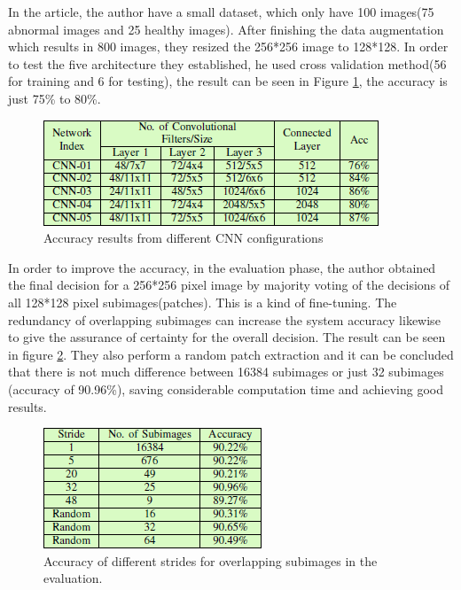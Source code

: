\documentclass[10pt,twocolumn,letterpaper]{article}
\begin{document}
In the article\cite{ribeiro2016colonic}, the author have a small dataset, which only have 100 images(75 abnormal images and 25 healthy images). After finishing the data augmentation which results in 800 images, they resized the 256*256 image to 128*128. In order to test the five architecture they established, he used cross validation method(56 for training and 6 for testing), the result can be seen in Figure \ref{fig:lnvong}, the accuracy is just 75\% to 80\%.

\begin{figure}[t]
	\begin{center}
		\includegraphics[width=0.8\linewidth]{Pic/4.png}
	\end{center}
	\caption{Accuracy results from different CNN configurations}
	\label{fig:lnvong}

\end{figure}

In order to improve the accuracy, in the evaluation phase, the author obtained the final decision for a 256*256 pixel image by majority voting of the decisions of all 128*128 pixel subimages(patches). This is a kind of fine-tuning. The redundancy of overlapping subimages can increase the system accuracy likewise to give the assurance of certainty for the overall decision. The result can be seen in figure \ref{fig:loghmkng}. They also perform a random patch extraction and it can be concluded that there is not much difference between 16384 subimages or
just 32 subimages (accuracy of 90.96\%), saving considerable computation time and achieving good results.

\begin{figure}[t]
	\begin{center}
		\includegraphics[width=0.8\linewidth]{Pic/5.png}
	\end{center}
	\caption{Accuracy of different strides for overlapping subimages in the evaluation.}
	\label{fig:loghmkng}

\end{figure}
\end{document}

